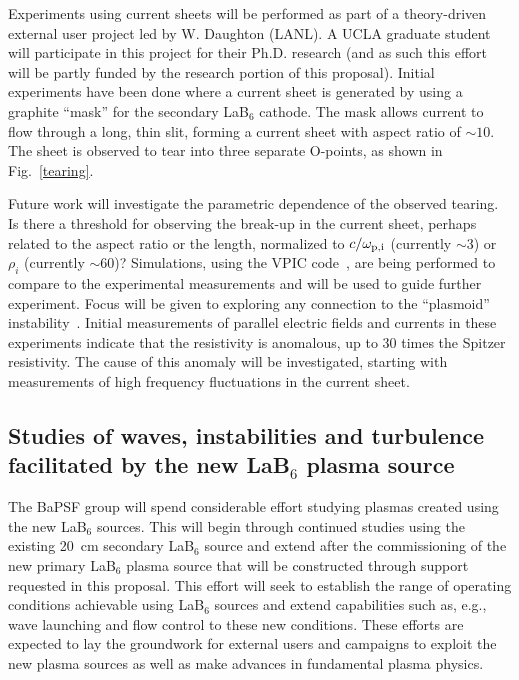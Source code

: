 \documentclass[11pt]{article}
\renewcommand{\cite}{\citep}
\begin{document}
 
Experiments using current sheets will be performed as part of a
theory-driven external user project led by W. Daughton (LANL).  A UCLA
graduate student will participate in this project for their
Ph.D. research (and as such this effort will be partly funded by the research
portion of this proposal).   Initial experiments have been done where
a current sheet is generated by using a graphite ``mask'' for the
secondary LaB$_6$ cathode.  The mask allows current to flow through a
long, thin slit, forming a current sheet with aspect ratio of $\sim
10$. The sheet is observed to tear into three separate O-points, as
shown in Fig.~\ref{tearing}.


Future work will investigate the parametric dependence of the observed
tearing.  Is there a threshold for observing the break-up in the
current sheet, perhaps related to the aspect ratio or the length,
normalized to $c/\omega_{\rm p,i}$ (currently $\sim 3$) or $\rho_i$
(currently $\sim 60$)?  Simulations, using the VPIC code~\cite{bowers:2009}, are being
performed to compare to the experimental measurements and will be used
to guide further experiment. Focus will be given to exploring any
connection to the ``plasmoid''
instability~\cite{loureiro:2007,daughton:2009}.   Initial measurements
of parallel electric fields and currents in these experiments indicate
that the resistivity is anomalous, up to 30 times the Spitzer
resistivity.  The cause of this anomaly will be investigated, starting
with measurements of high frequency fluctuations in the current sheet.    



\subsection{Studies of waves, instabilities and turbulence facilitated
  by the new LaB$_6$ plasma source}

The BaPSF group will spend considerable effort studying plasmas
created using the new LaB$_6$ sources.  This will begin through
continued studies using the existing 20~cm secondary LaB$_6$ source
and extend after the commissioning of the new primary LaB$_6$ plasma
source that will be constructed through support requested in this
proposal.  This effort will seek to establish the range of operating
conditions achievable using LaB$_6$ sources and extend capabilities
such as, e.g., wave launching and flow control to these new
conditions.   These efforts are expected to lay the groundwork for
external users and campaigns to exploit the new plasma sources as well
as make advances in fundamental plasma physics.
\end{document}

